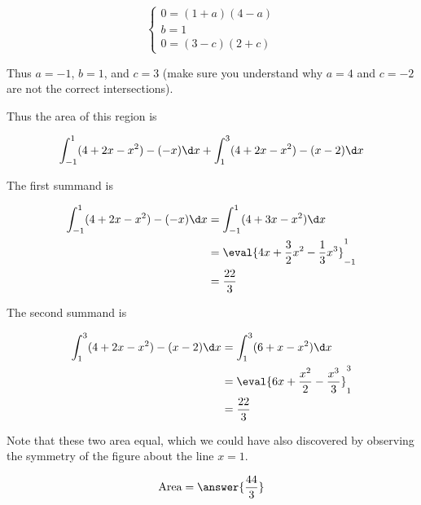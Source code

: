\documentclass[handout]{ximera}
\begin{document}
\begin{exercise}
\begin{hint}
\[	
	\begin{cases}
		0 = (1+a)(4-a)\\
		 b = 1\\
		0= (3-c)(2+c)
	\end{cases}	
\]

Thus $a=-1$,  $b = 1$, and $c = 3$ (make sure you understand why $a=4$ and $c=-2$ are not the correct intersections).
\end{hint}


\begin{hint}
	Thus the area of this region is

	\[
	\int_{-1}^{1} (4+2x-x^2) - (-x) \d x + \int_{1}^{3} (4+2x-x^2) - (x-2) \d x
	\]
\end{hint}

\begin{hint}
	The first summand is

	\begin{align*}
		\int_{-1}^{1} (4+2x-x^2) - (-x) \d x &=  \int_{-1}^{1} (4+3x-x^2) \d x\\
		&= \eval{4x+\frac{3}{2}x^2-\frac{1}{3}x^3}_{-1}^1\\
		&= \frac{22}{3}
	\end{align*}

	The second summand is

	\begin{align*}
		\int_{1}^{3} (4+2x-x^2) - (x-2) \d x &= \int_{1}^{3} (6+x-x^2) \d x\\
		&= \eval{6x+\frac{x^2}{2}-\frac{x^3}{3}}_1^3\\
		&= \frac{22}{3}
	\end{align*}

	Note that these two area equal, which we could have also discovered by observing the symmetry of the figure about the line $x=1$.
\end{hint}

\begin{prompt}
	\[
		\textrm{Area} = \answer{\frac{44}{3}}
	\]
\end{prompt}

\end{exercise}
\end{document}
